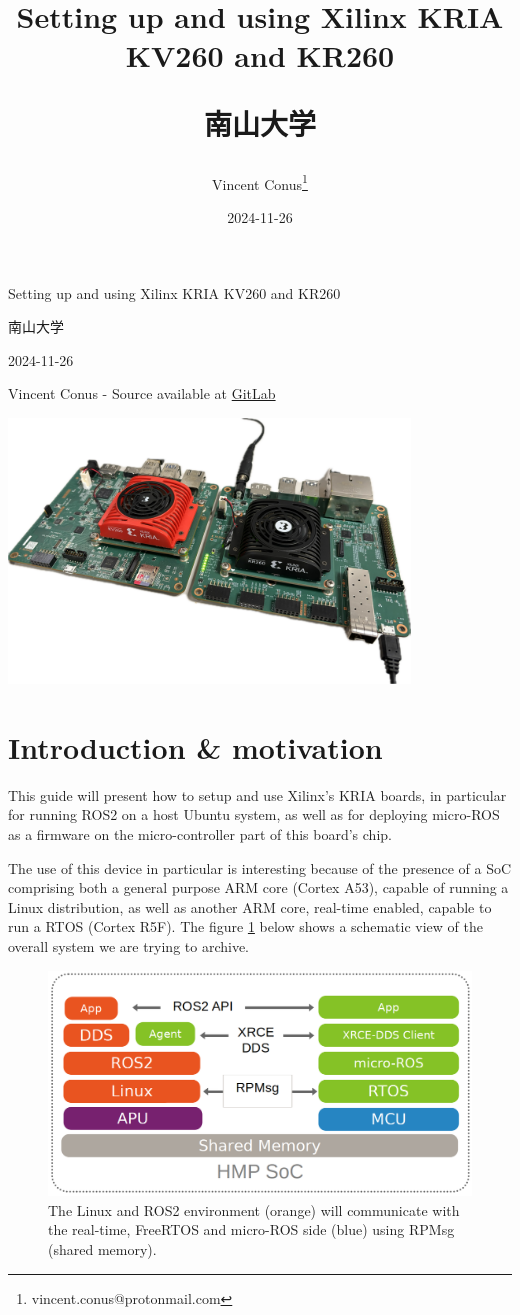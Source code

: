 \documentclass[10pt]{article}
\author{Vincent Conus\thanks{vincent.conus@protonmail.com}}
\date{2024-11-26}
\title{Setting up and using Xilinx KRIA KV260 and KR260\\\medskip
\large \begin{CJK}{UTF8}{min}南山大学\end{CJK}}
\newcommand{\gitlab}[1]{%
\href{#1}{GitLab \faGitlab}}
\begin{document}
\begin{titlepage}
\centering
{\LARGE Setting up and using Xilinx KRIA KV260 and KR260 \par }
\vspace{5mm}
{\large \begin{CJK}{UTF8}{min}南山大学\end{CJK} \par}
\vspace{1cm}
{\large 2024-11-26 \par}
\vspace{2cm}
{\large Vincent Conus -  Source available at \gitlab{https://gitlab.com/sunoc/xilinx-kria-kv260-documentation} \par}
\vspace{3cm}
\includegraphics[width=0.8\textwidth]{./img/boards}\end{titlepage}
\tableofcontents
\pagebreak
\section{Introduction \& motivation}
\label{sec:org547aa47}
This guide will present how to setup and use Xilinx's KRIA boards, in particular
for running ROS2 on a host Ubuntu system, as well as for deploying
micro-ROS\cite{Belsare2023} as a firmware on the micro-controller part of this board's chip.

The use of this device in particular is interesting because of the presence of a
SoC comprising both a general purpose ARM core (Cortex A53), capable of running a Linux
distribution, as well as another ARM core, real-time enabled, capable to run a
RTOS (Cortex R5F). The figure \ref{fig:org33ad027} below shows a schematic view of the overall system we
are trying to archive.

\begin{figure}[htbp]
\centering
\includegraphics[width=.6\textwidth]{img/map.png}
\caption{\label{fig:org33ad027}The Linux and ROS2 environment (orange) will communicate with the real-time, FreeRTOS and micro-ROS side (blue) using RPMsg (shared memory).}
\end{figure}
\end{document}
